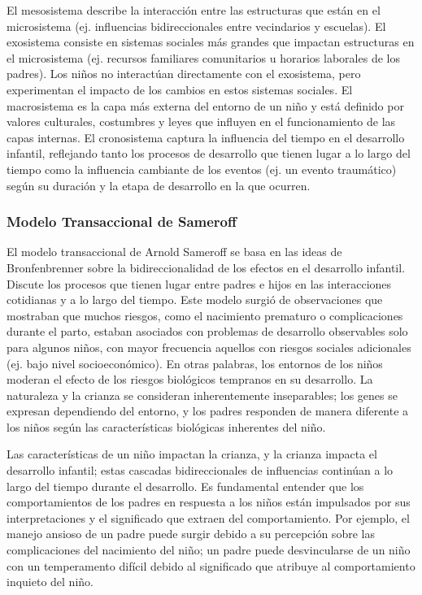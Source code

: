 \documentclass[11pt,letterpaper]{report}
\begin{document}
El mesosistema describe la interacción entre las estructuras que están en el
microsistema (ej. influencias bidireccionales entre vecindarios y escuelas).
El exosistema consiste en sistemas sociales más grandes que impactan
estructuras en el microsistema (ej. recursos familiares comunitarios u horarios
laborales de los padres). Los niños no interactúan directamente con el
exosistema, pero experimentan el impacto de los cambios en estos sistemas
sociales. El macrosistema es la capa más externa del entorno de un niño y está
definido por valores culturales, costumbres y leyes que influyen en el
funcionamiento de las capas internas. El cronosistema captura la influencia del
tiempo en el desarrollo infantil, reflejando tanto los procesos de desarrollo
que tienen lugar a lo largo del tiempo como la influencia cambiante de los
eventos (ej. un evento traumático) según su duración y la etapa de desarrollo
en la que ocurren. \cite{Feldman3}

\subsubsection{Modelo Transaccional de Sameroff}
El modelo transaccional de Arnold Sameroff se basa en las ideas de
Bronfenbrenner sobre la bidireccionalidad de los efectos en el desarrollo
infantil. Discute los procesos que tienen lugar entre padres e hijos en las
interacciones cotidianas y a lo largo del tiempo. Este modelo surgió de
observaciones que mostraban que muchos riesgos, como el nacimiento prematuro o
complicaciones durante el parto, estaban asociados con problemas de desarrollo
observables solo para algunos niños, con mayor frecuencia aquellos con riesgos
sociales adicionales (ej. bajo nivel socioeconómico). En otras
palabras, los entornos de los niños moderan el efecto de los riesgos
biológicos tempranos en su desarrollo. La naturaleza y la crianza se consideran
inherentemente inseparables; los genes se expresan dependiendo del entorno, y
los padres responden de manera diferente a los niños según las características
biológicas inherentes del niño. \cite{Feldman3}

Las características de un niño impactan la crianza, y la crianza impacta el
desarrollo infantil; estas cascadas bidireccionales de influencias continúan a
lo largo del tiempo durante el desarrollo. Es fundamental entender que los
comportamientos de los padres en respuesta a los niños están impulsados por
sus interpretaciones y el significado que extraen del comportamiento. Por
ejemplo, el manejo ansioso de un padre puede surgir debido a su percepción
sobre las complicaciones del nacimiento del niño; un padre puede desvincularse
de un niño con un temperamento difícil debido al significado que atribuye al
comportamiento inquieto del niño. \cite{Sameroff2009}
\end{document}
